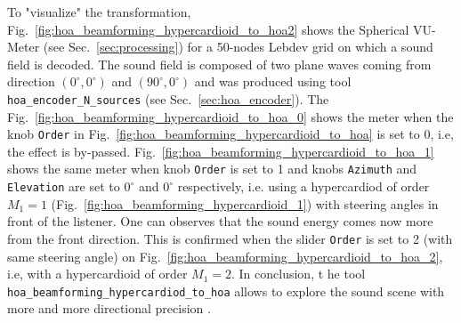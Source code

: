 \documentclass[10pt,a4paper]{article}
\begin{document}
To "visualize" the transformation, Fig.~\ref{fig:hoa_beamforming_hypercardioid_to_hoa2} shows the Spherical VU-Meter (see Sec.~\ref{sec:processing}) for a 50-nodes Lebdev grid on which a sound field is decoded. The sound field is composed of two plane waves coming from direction $(0^\circ,0^\circ)$ and $(90^\circ,0^\circ)$ and was produced using tool \lstinline'hoa_encoder_N_sources' (see Sec.~\ref{sec:hoa_encoder}). The Fig.~\ref{fig:hoa_beamforming_hypercardioid_to_hoa_0} shows the meter when the knob \lstinline'Order' in Fig.~\ref{fig:hoa_beamforming_hypercardioid_to_hoa} is set to 0, i.e, the effect is by-passed. Fig.~\ref{fig:hoa_beamforming_hypercardioid_to_hoa_1} shows the same meter when knob \lstinline'Order' is set to 1 and knobs \lstinline'Azimuth' and \lstinline'Elevation' are set to $0^\circ$ and $0^\circ$ respectively, i.e. using a hypercardiod of order $M_1=1$ (Fig.~\ref{fig:hoa_beamforming_hypercardioid_1}) with steering angles in front of the listener. One can observes that the sound energy comes now more from the front direction. This is confirmed when the slider \lstinline'Order' is set to 2 (with same steering angle) on Fig.~\ref{fig:hoa_beamforming_hypercardioid_to_hoa_2}, i.e, with a hypercardioid of order $M_1=2$. In conclusion, t he tool \lstinline'hoa_beamforming_hypercardiod_to_hoa' allows to explore the sound scene with more and more directional precision \cite{lecomte2016filtrage}.
\end{document}
